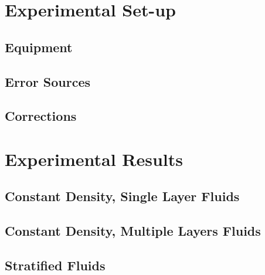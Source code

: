 \documentclass{article}
\begin{document}
\clearpage
\section{Experimental Set-up}

\subsection{Equipment}

\subsection{Error Sources}

\subsection{Corrections}

\section{Experimental Results}

\subsection{Constant Density, Single Layer Fluids}

\subsection{Constant Density, Multiple Layers Fluids}

\subsection{Stratified Fluids}
\end{document}
